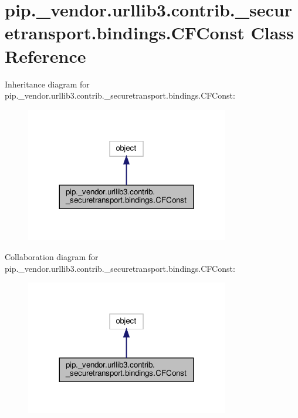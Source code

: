\hypertarget{classpip_1_1__vendor_1_1urllib3_1_1contrib_1_1__securetransport_1_1bindings_1_1CFConst}{}\section{pip.\+\_\+vendor.\+urllib3.\+contrib.\+\_\+securetransport.\+bindings.\+C\+F\+Const Class Reference}
\label{classpip_1_1__vendor_1_1urllib3_1_1contrib_1_1__securetransport_1_1bindings_1_1CFConst}


Inheritance diagram for pip.\+\_\+vendor.\+urllib3.\+contrib.\+\_\+securetransport.\+bindings.\+C\+F\+Const\+:
\nopagebreak
\begin{figure}[H]
\begin{center}
\leavevmode
\includegraphics[width=251pt]{classpip_1_1__vendor_1_1urllib3_1_1contrib_1_1__securetransport_1_1bindings_1_1CFConst__inherit__graph}
\end{center}
\end{figure}


Collaboration diagram for pip.\+\_\+vendor.\+urllib3.\+contrib.\+\_\+securetransport.\+bindings.\+C\+F\+Const\+:
\nopagebreak
\begin{figure}[H]
\begin{center}
\leavevmode
\includegraphics[width=251pt]{classpip_1_1__vendor_1_1urllib3_1_1contrib_1_1__securetransport_1_1bindings_1_1CFConst__coll__graph}
\end{center}
\end{figure}
